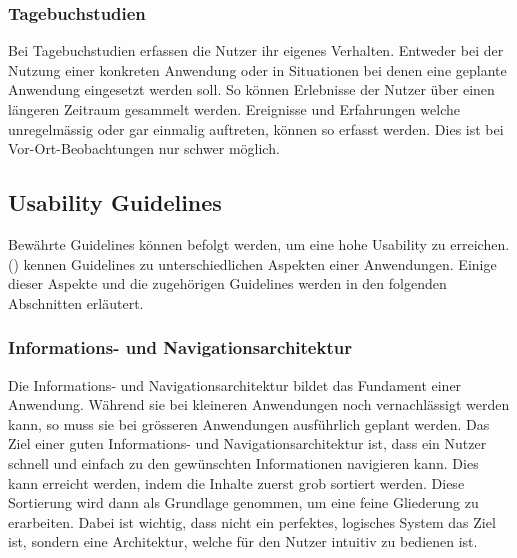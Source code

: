 \subsubsection{Tagebuchstudien}\label{tagebuchstudien}
Bei Tagebuchstudien erfassen die Nutzer ihr eigenes Verhalten.
Entweder bei der Nutzung einer konkreten Anwendung oder in Situationen bei denen eine geplante Anwendung eingesetzt werden soll.
So können Erlebnisse der Nutzer über einen längeren Zeitraum gesammelt werden.
Ereignisse und Erfahrungen welche unregelmässig oder gar einmalig auftreten, können so erfasst werden.
Dies ist bei Vor-Ort-Beobachtungen nur schwer möglich.

\subsection{Usability Guidelines}\label{guidelines}
Bewährte Guidelines können befolgt werden, um eine hohe Usability zu erreichen.
\citeauthor{usability} (\citeyear{usability}) kennen Guidelines zu unterschiedlichen Aspekten einer Anwendungen.
Einige dieser Aspekte und die zugehörigen Guidelines werden in den folgenden Abschnitten erläutert.

\subsubsection{Informations- und Navigationsarchitektur}
Die Informations- und Navigationsarchitektur bildet das Fundament einer Anwendung.
Während sie bei kleineren Anwendungen noch vernachlässigt werden kann, so muss sie bei grösseren Anwendungen ausführlich geplant werden.
Das Ziel einer guten Informations- und Navigationsarchitektur ist, dass ein Nutzer schnell und einfach zu den gewünschten Informationen navigieren kann.
Dies kann erreicht werden, indem die Inhalte zuerst grob sortiert werden.
Diese Sortierung wird dann als Grundlage genommen, um eine feine Gliederung zu erarbeiten.
Dabei ist wichtig, dass nicht ein perfektes, logisches System das Ziel ist, sondern eine Architektur, welche für den Nutzer intuitiv zu bedienen ist.


